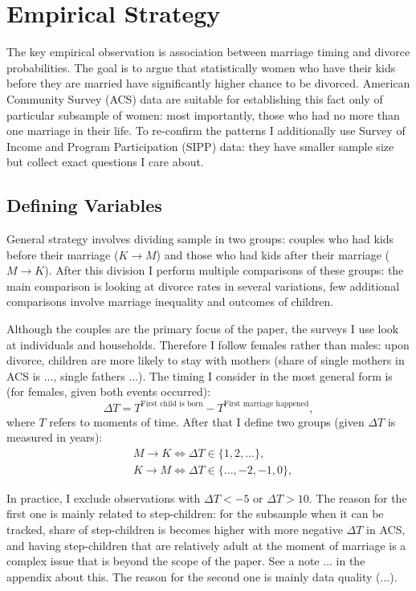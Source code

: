 \documentclass[12pt,letter]{article}
\begin{document}
\section{Empirical Strategy}
The key empirical observation is association between marriage timing and divorce probabilities. The goal is to argue that statistically women who have their kids before they are married have significantly higher chance to be divorced. American Community Survey (ACS) data are suitable for establishing this fact only of particular subsample of women: most importantly, those who had no more than one marriage in their life. To re-confirm the patterns I additionally use Survey of Income and Program Participation (SIPP) data: they have smaller sample size but collect exact questions I care about.

\subsection{Defining Variables}

General strategy involves dividing sample in two groups: couples who had kids before their marriage ($K\to M$) and those who had kids after their marriage ($M\to K$). After this division I perform multiple comparisons of these groups: the main comparison is looking at divorce rates in several variations, few additional comparisons involve marriage inequality and outcomes of children.

Although the couples are the primary focus of the paper, the surveys I use look at individuals and households. Therefore I follow females rather than males: upon divorce, children are more likely to stay with mothers (share of single mothers in ACS is ..., single fathers ...). The timing I consider in the  most general form is (for females, given both events occurred): 
\[\Delta T = T^{\text{First child  is born}} - T^{\text{First marriage happened}},\]
where $T$ refers to moments of time. After that I define two groups (given $\Delta T$ is measured in years):
\begin{align*}&M\to K \Leftrightarrow \Delta T \in \{1,2,...\},\\
&K\to M \Leftrightarrow \Delta T \in \{...,-2,-1,0\},\end{align*}

In practice, I exclude observations with $\Delta T < -5$ or $\Delta T > 10$. The reason for the first one is mainly related to step-children: for the subsample when it can be tracked, share of step-children is becomes higher with more negative $\Delta  T$ in ACS, and having step-children that are relatively adult at the moment of marriage is a complex issue that is beyond the scope of the paper. See a note ... in the appendix about this. The reason for the second one is mainly data quality (...).
\end{document}
